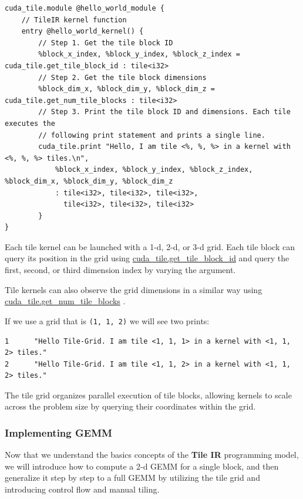 \documentclass{article}
\begin{document}
\begin{lstlisting}
cuda_tile.module @hello_world_module {
    // TileIR kernel function
    entry @hello_world_kernel() {
        // Step 1. Get the tile block ID
        %block_x_index, %block_y_index, %block_z_index = cuda_tile.get_tile_block_id : tile<i32>
        // Step 2. Get the tile block dimensions
        %block_dim_x, %block_dim_y, %block_dim_z = cuda_tile.get_num_tile_blocks : tile<i32>
        // Step 3. Print the tile block ID and dimensions. Each tile executes the 
        // following print statement and prints a single line.
        cuda_tile.print "Hello, I am tile <%, %, %> in a kernel with <%, %, %> tiles.\n",
            %block_x_index, %block_y_index, %block_z_index, %block_dim_x, %block_dim_y, %block_dim_z
            : tile<i32>, tile<i32>, tile<i32>,
              tile<i32>, tile<i32>, tile<i32>
        }
}
\end{lstlisting}

Each tile kernel can be launched with a 1-d, 2-d, or 3-d grid. Each tile block can query its position in the grid using \href{https://docs.nvidia.com/cuda/tile-ir/latest/sections/operations.html#op-cuda-tile-get-tile-block-id}{cuda\_tile.get\_tile\_block\_id} and query the first, second, or third dimension index by varying the argument.

Tile kernels can also observe the grid dimensions in a similar way using \href{https://docs.nvidia.com/cuda/tile-ir/latest/sections/operations.html#op-cuda-tile-get-num-tile-blocks}{cuda\_tile.get\_num\_tile\_blocks} .


If we use a grid that is \texttt{(1, 1, 2)} we will see two prints:


\begin{lstlisting}
1      "Hello Tile-Grid. I am tile <1, 1, 1> in a kernel with <1, 1, 2> tiles."
2      "Hello Tile-Grid. I am tile <1, 1, 2> in a kernel with <1, 1, 2> tiles."
\end{lstlisting}

The tile grid organizes parallel execution of tile blocks, allowing kernels to scale across the problem size by querying their coordinates within the grid.


\subsubsection{Implementing GEMM}

Now that we understand the basics concepts of the \textbf{Tile IR} programming model, we will introduce how to compute a 2-d GEMM for a single block, and then generalize it step by step to a full GEMM by utilizing the tile grid and introducing control flow and manual tiling.
\end{document}
